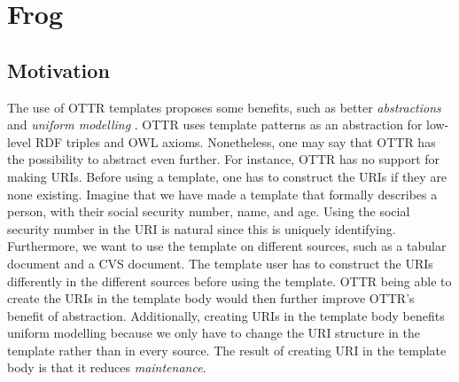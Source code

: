 \section{Frog}

\subsection{Motivation}
\label{motivation}
The use of OTTR templates proposes some benefits, such as better \emph{abstractions} \autocite[9]{SLKK_OTTR_2021} and \emph{uniform modelling} \autocite{Lupp_tliam}.  OTTR uses template patterns as an abstraction for low-level RDF triples and OWL axioms. Nonetheless, one may say that OTTR has the possibility to abstract even further. For instance, OTTR has no support for making URIs. Before using a template, one has to construct the URIs if they are none existing. Imagine that we have made a template that formally describes a person, with their social security number, name, and age. Using the social security number in the URI is natural since this is uniquely identifying. Furthermore, we want to use the template on different sources, such as a tabular document and a CVS document. The template user has to construct the URIs differently in the different sources before using the template. OTTR being able to create the URIs in the template body would then further improve OTTR's benefit of abstraction. Additionally, creating URIs in the template body benefits uniform modelling because we only have to change the URI structure in the template rather than in every source. The result of creating URI in the template body is that it reduces \emph{maintenance}.

